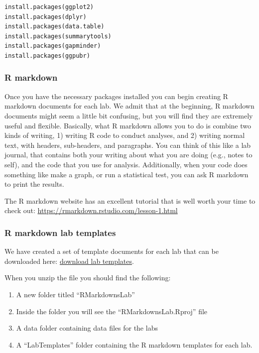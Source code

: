 \documentclass[]{book}
\providecommand{\tightlist}{%
  \setlength{\itemsep}{0pt}\setlength{\parskip}{0pt}}
\begin{document}
\begin{verbatim}
install.packages(ggplot2)
install.packages(dplyr)
install.packages(data.table)
install.packages(summarytools)
install.packages(gapminder)
install.packages(ggpubr)
\end{verbatim}

\subsubsection{R markdown}\label{r-markdown}

Once you have the necessary packages installed you can begin creating R
markdown documents for each lab. We admit that at the beginning, R
markdown documents might seem a little bit confusing, but you will find
they are extremely useful and flexible. Basically, what R markdown
allows you to do is combine two kinds of writing, 1) writing R code to
conduct analyses, and 2) writing normal text, with headers, sub-headers,
and paragraphs. You can think of this like a lab journal, that contains
both your writing about what you are doing (e.g., notes to self), and
the code that you use for analysis. Additionally, when your code does
something like make a graph, or run a statistical test, you can ask R
markdown to print the results.

The R markdown website has an excellent tutorial that is well worth your
time to check out: \url{https://rmarkdown.rstudio.com/lesson-1.html}

\subsubsection{R markdown lab templates}\label{r-markdown-lab-templates}

We have created a set of template documents for each lab that can be
downloaded here:
\href{https://github.com/CrumpLab/statisticsLab/raw/master/RMarkdownsLab.zip}{download
lab templates}.

When you unzip the file you should find the following:

\begin{enumerate}
\def\labelenumi{\arabic{enumi}.}
\tightlist
\item
  A new folder titled ``RMarkdownsLab''
\item
  Inside the folder you will see the ``RMarkdownsLab.Rproj'' file
\item
  A data folder containing data files for the labs
\item
  A ``LabTemplates'' folder containing the R markdown templates for each
  lab.
\end{enumerate}
\end{document}
